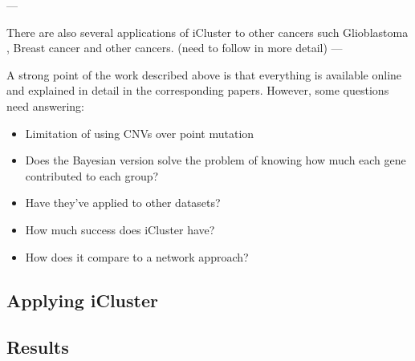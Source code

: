 --- 

There are also several applications of iCluster to other cancers such Glioblastoma \cite{Shen2012-yj},  Breast cancer \citet{Curtis2012-ff} and other cancers. (need to follow in more detail)
--- 

A strong point of the work described above is that everything is available online and explained in detail in the corresponding papers. However, some questions need answering:

\begin{itemize}
    \item Limitation of using CNVs over point mutation
    \item Does the Bayesian version solve the problem of knowing how much each gene contributed to each group?
    \item Have they've applied to other datasets?
    \item How much success does iCluster have?
    \item How does it compare to a network approach?
\end{itemize}

\subsection{Applying iCluster}

\subsection{Results}

